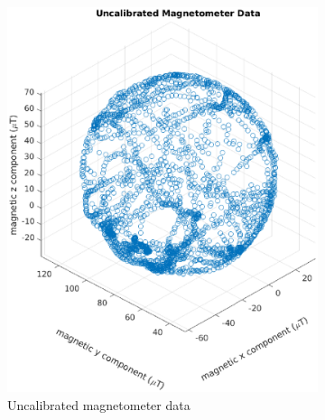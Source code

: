 \begin{figure}[H]
	\centering
	\begin{subfigure}[t]{.45\textwidth}
		\centering
		\includegraphics[trim=80 0 80 0, clip,width=1.1\linewidth]{images/20201020_1125_Uncalibrated_Magnetometer_Data}
		\caption{Uncalibrated magnetometer data}
		\label{fig:uncalibrated_magnetometer_data}
	\end{subfigure}
	\begin{subfigure}[t]{0.45\textwidth}
		\centering

\end{subfigure}
\end{figure}

